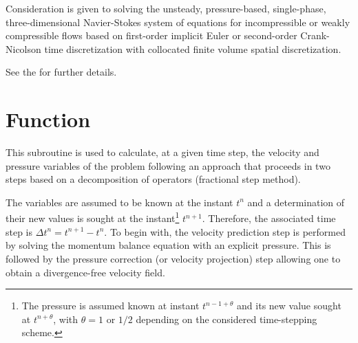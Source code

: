 
%
%
%
%


\label{ap:navstv}

\hypertarget{navstv}{}

Consideration is given to solving the unsteady, pressure-based,
single-phase, three-dimensional Navier-Stokes system of equations for
incompressible or weakly compressible flows based on first-order implicit
Euler or second-order Crank-Nicolson time discretization with collocated
finite volume spatial discretization.

See the  for further details.

\section*{Function}

This subroutine is used to calculate, at a given time step, the velocity
 and pressure variables of the problem following an approach that proceeds
 in two steps based on a decomposition of operators (fractional step method).

The variables are assumed to be known at the instant ${t^n}$ and a
determination of their new values is sought at the
instant\footnote{The pressure is assumed known at instant $t^{n-1+\theta}$
and its new value sought at $t^{n+\theta}$, with $\theta=1$ or $1/2$
depending on the considered time-stepping scheme.} ${t^{n+1}}$.
Therefore, the associated time step is ${\Delta {t^n} ={t^{n+1}- {t^n}}}$.
To begin with, the velocity prediction step is performed by solving the
momentum balance equation with an explicit pressure. This is followed by
the pressure correction (or velocity projection) step allowing one to obtain
a divergence-free velocity field.

